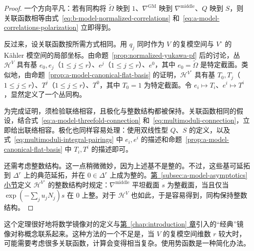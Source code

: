 \begin{proof}
一个方向平凡：若有同构将 $\widetilde\Omega$ 映到 $1$、$\nabla^{\mathrm{GM}}$ 映到 $\nabla^{\mathrm{middle}}$、$Q$ 映到 $S$，则关联函数相等由式~\eqref{eq:b-model-normalized-correlations} 和~\eqref{eq:a-model-correlations-polarization} 立即得到。

反过来，设关联函数按所需方式相同。用 $q_j$ 同时作为 $V$ 的复模空间与 $V^\circ$ 的 Kähler 模空间的局部坐标。由命题~\ref{prop:normalized-yukawa-pf} 后的讨论，丛 $\mathcal H^V$ 具有基 $e_0,e_j$（$1\le j\le r$）、$e^j$（$1\le j\le r$）、$e^0$，其中 $e_0=\widetilde\Omega$ 是特定截面。类似地，由命题~\ref{prop:a-model-canonical-flat-basis} 的证明，$\mathcal H^{V^\circ}$ 具有基 $T_0,T_j$（$1\le j\le r$）、$T^j$（$1\le j\le r$）、$T^0$，其中 $T_0=1$ 为特定截面。令 $e_i\mapsto T_i$、$e^i\mapsto T^i$，显然定义了一个丛同构。

为完成证明，须检验联络相容，且极化与整数结构都被保持。关联函数相同的假设，结合式~\eqref{eq:a-model-threefold-connection} 和~\eqref{eq:multimoduli-connection}，立即给出联络相容。极化也同样容易处理：使用双线性型 $Q$、$S$ 的定义，以及式~\eqref{eq:multimoduli-integral-pairings} 中 $e_i,e^i$ 的描述和命题~\ref{prop:a-model-canonical-flat-basis} 中 $T_i,T^i$ 的描述即可。

还需考虑整数结构。这一点稍微微妙，因为上述基不是整的。不过，这些基可延拓到 $\Delta^r$ 上的典范延拓，并在 $0\in\Delta^r$ 上成为整的。\hyperref[subsec:a-model-asymptotics]{第~\ref*{subsec:a-model-asymptotics} 小节}定义 $\mathcal H^{V^\circ}$ 的整数结构时规定：$\nabla^{\mathrm{middle}}$ 平坦截面 $s$ 为整截面，当且仅当 $\exp(-\sum_ju_jN_j)s$ 在 $0$ 上整。对于 $\mathcal H^V$ 也如此，于是容易得到，同构保持整数结构。

\end{proof}
这个定理很好地将数学镜像对的定义与\hyperref[chap:introduction]{第~\ref*{chap:introduction} 章}引入的“经典”镜像对称概念联系起来。这种方法的一个不足是，当 $V$ 的复模空间维数 $r$ 较大时，可能需要考虑很多关联函数，计算会变得相当复杂。使用势函数是一种简化办法。

